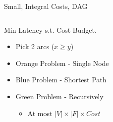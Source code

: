 \begin{frame}{Small, Integral Costs, DAG}
\begin{columns}
\begin{column}{.53\textwidth}

Min Latency s.t. Cost Budget.
\only<+>{}
\begin{itemize}[<+>]
  \item Pick 2 arcs ($x \geq y$)
  \item {\color{orange} Orange Problem} - Single Node
  \item {\color{blue} Blue Problem} - Shortest Path
  \item<+-> {\color{green} Green Problem} - Recursively
  \begin{itemize}
    \item<+-> At most $|V| \times |F| \times Cost$
  \end{itemize}
\end{itemize}
\vspace{4cm}

\end{column}
\begin{column}{.6\textwidth}



\end{column}
\end{columns}
\end{frame}